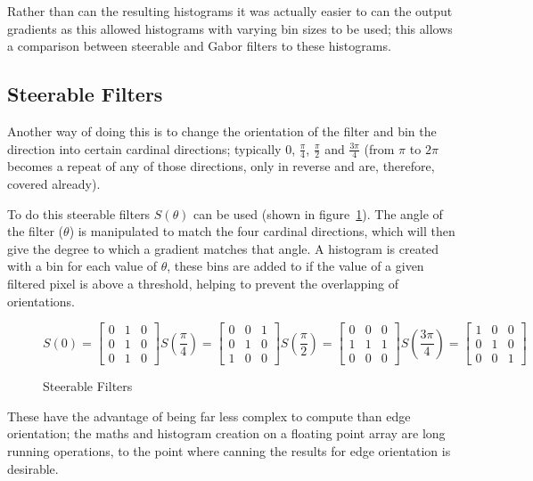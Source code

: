 Rather than can the resulting histograms it was actually easier to can the output gradients as 
this allowed histograms with varying bin sizes to be used; this allows a comparison between 
steerable and Gabor filters to these histograms.

\subsection{Steerable Filters}
Another way of doing this is to change the orientation of the filter and bin the direction into 
certain cardinal directions; typically $0$, $\frac{\pi}{4}$, $\frac{\pi}{2}$ and $\frac{3\pi}{4}$
(from $\pi$ to $2\pi$ becomes a repeat of any of those directions, only in reverse and are, 
therefore, covered already).

To do this steerable filters $S(\theta)$ can be used (shown in figure~\ref{fig:steerable-filters}). 
The angle of the filter ($\theta$) is manipulated to match the four cardinal directions, which 
will then give the degree to which a gradient matches that angle. A histogram is created with a
bin for each value of $\theta$, these bins are added to if the value of a given filtered pixel is
above a threshold, helping to prevent the overlapping of orientations.

\begin{figure}[h]
$$
S\left(0\right) = 
\begin{bmatrix}
0 & 1 & 0 \\
0 & 1 & 0 \\
0 & 1 & 0
\end{bmatrix}
S\left(\frac{\pi}{4}\right) =
\begin{bmatrix}
0 & 0 & 1 \\
0 & 1 & 0 \\
1 & 0 & 0
\end{bmatrix}
S\left(\frac{\pi}{2}\right) = 
\begin{bmatrix}
0 & 0 & 0 \\
1 & 1 & 1 \\
0 & 0 & 0
\end{bmatrix}
S\left(\frac{3\pi}{4}\right) = 
\begin{bmatrix}
1 & 0 & 0 \\
0 & 1 & 0 \\
0 & 0 & 1
\end{bmatrix}
$$
\caption{Steerable Filters}
\label{fig:steerable-filters}
\end{figure}

These have the advantage of being far less complex to compute than edge orientation; the maths and
histogram creation on a floating point array are long running operations, to the point where
canning the results for edge orientation is desirable.

